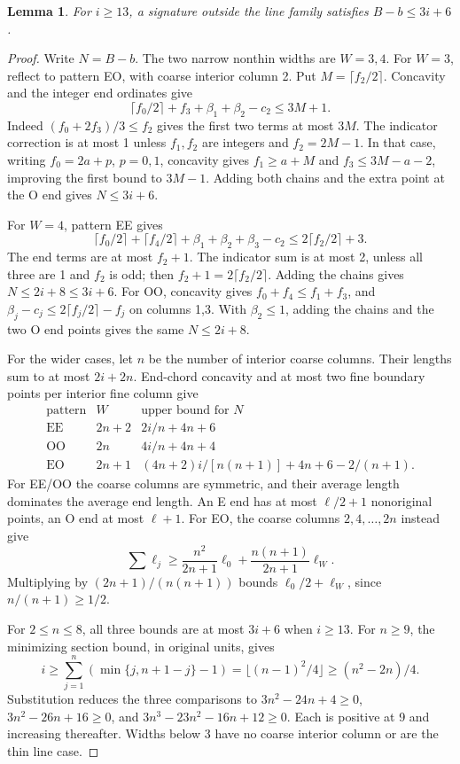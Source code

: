 \documentclass[11pt]{article}
\newtheorem{lemma}[theorem]{Lemma}
\begin{document}
\begin{lemma}\label{lem:boundarycap}
For \(i\ge13\), a signature outside the line family satisfies \(B-b\le3i+6\).
\end{lemma}
\begin{proof}
Write \(N=B-b\). The two narrow nonthin widths are \(W=3,4\).
For \(W=3\), reflect to pattern EO, with coarse interior column 2.
Put \(M=\lceil f_2/2\rceil\). Concavity and the integer end ordinates give
\[
 \lceil f_0/2\rceil+f_3+\beta_1+\beta_2-c_2\le3M+1.
\]
Indeed \((f_0+2f_3)/3\le f_2\) gives the first two terms at most \(3M\).
The indicator correction is at most 1 unless \(f_1,f_2\) are integers
and \(f_2=2M-1\). In that case, writing \(f_0=2a+p\), \(p=0,1\),
concavity gives \(f_1\ge a+M\) and \(f_3\le3M-a-2\), improving
the first bound to \(3M-1\).
Adding both chains and the extra point at the O end gives \(N\le3i+6\).

For \(W=4\), pattern EE gives
\[
 \lceil f_0/2\rceil+\lceil f_4/2\rceil+
 \beta_1+\beta_2+\beta_3-c_2\le2\lceil f_2/2\rceil+3.
\]
The end terms are at most \(f_2+1\). The indicator sum is at most 2,
unless all three are 1 and \(f_2\) is odd; then \(f_2+1=2\lceil f_2/2\rceil\).
Adding the chains gives \(N\le2i+8\le3i+6\).
For OO, concavity gives \(f_0+f_4\le f_1+f_3\), and
\(\beta_j-c_j\le2\lceil f_j/2\rceil-f_j\) on columns 1,3.
With \(\beta_2\le1\), adding the chains and the two O end points gives
the same \(N\le2i+8\).

For the wider cases, let \(n\) be the number of interior coarse columns.
Their lengths sum to at most \(2i+2n\). End-chord concavity and at most
two fine boundary points per interior fine column give
\[
\begin{array}{c|c|c}
\text{pattern}&W&\text{upper bound for }N\\ \hline
\mathrm{EE}&2n+2&2i/n+4n+6\\
\mathrm{OO}&2n&4i/n+4n+4\\
\mathrm{EO}&2n+1&(4n+2)i/[n(n+1)]+4n+6-2/(n+1).
\end{array}
\]
For EE/OO the coarse columns are symmetric, and their average length
dominates the average end length. An E end has at most \(\ell/2+1\)
nonoriginal points, an O end at most \(\ell+1\).
For EO, the coarse columns \(2,4,\ldots,2n\) instead give
\[
 \sum\ell_j\ge\frac{n^2}{2n+1}\ell_0+
                  \frac{n(n+1)}{2n+1}\ell_W.
\]
Multiplying by \((2n+1)/(n(n+1))\) bounds \(\ell_0/2+\ell_W\),
since \(n/(n+1)\ge1/2\).

For \(2\le n\le8\), all three bounds are at most \(3i+6\) when \(i\ge13\).
For \(n\ge9\), the minimizing section bound, in original units, gives
\[
 i\ge\sum_{j=1}^n(\min\{j,n+1-j\}-1)
   =\lfloor(n-1)^2/4\rfloor\ge(n^2-2n)/4.
\]
Substitution reduces the three comparisons to
\(3n^2-24n+4\ge0\), \(3n^2-26n+16\ge0\), and
\(3n^3-23n^2-16n+12\ge0\). Each is positive at 9 and increasing thereafter.
Widths below 3 have no coarse interior column or are the thin line case.
\end{proof}
\end{document}
